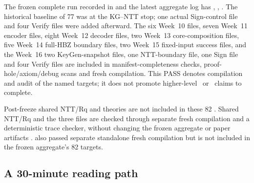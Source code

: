 \begin{verified}
The frozen complete run recorded in  and the
latest aggregate log has  ,
, . The historical
baseline of 77 was at the KG--NTT stop; one actual Sign-control file and four
Verify files were added afterward. The six Week~10 files, seven Week~11 encoder
files, eight Week~12 decoder files, two Week~13 core-composition files, five
Week~14 full-HBZ boundary files, two Week~15 fixed-input success files, and the
Week~16 two KeyGen-snapshot files, one NTT-boundary file, one Sign file and four
Verify files are included in manifest-completeness checks, proof-hole/axiom/debug
scans and fresh compilation. This PASS denotes compilation and audit of the
named targets; it does not promote higher-level \statuspartial\ or
\statusblocked\ claims to complete.

Post-freeze shared NTT/Rq and  theories are not included
in these 82 \cite{paper-freeze-artifacts}. Shared NTT/Rq and the three
 files are checked through separate fresh
compilation and a deterministic trace checker, without changing the frozen
aggregate or paper artifacts \cite{post-freeze-kg-rq-haetae-report,
post-freeze-kg-actual-avec-qj-report}.
 also passed separate standalone fresh
compilation but is not included in the frozen aggregate's 82 targets.
\end{verified}

\subsection{A 30-minute reading path}


